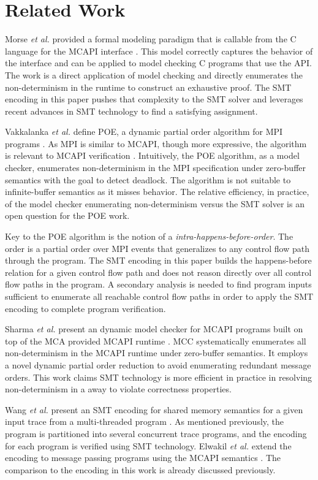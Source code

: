 \section{Related Work}
Morse \emph{et al.} provided a formal modeling paradigm that is callable from
the C language for the MCAPI interface \cite{morse:vmcai12}. This
model correctly captures the behavior of the interface and can be
applied to model checking C programs that use the API. The work is a
direct application of model checking and directly enumerates the
non-determinism in the runtime to construct an exhaustive proof. The
SMT encoding in this paper pushes that complexity to the SMT solver
and leverages recent advances in SMT technology to find a satisfying
assignment.

Vakkalanka \emph{et al.} define POE, a dynamic partial order algorithm for
MPI programs \cite{sarvani:fm09, flanagan:popl05}. As MPI is similar
to MCAPI, though more expressive, the algorithm is relevant to MCAPI
verification \cite{mpi}. Intuitively, the POE algorithm, as a model
checker, enumerates non-determinism in the MPI specification under
zero-buffer semantics with the goal to detect deadlock. The algorithm
is not suitable to infinite-buffer semantics as it misses
behavior. The relative efficiency, in practice, of the model checker
enumerating non-determinism versus the SMT solver is an open question
for the POE work.

Key to the POE algorithm is the notion of a
\textit{intra-happens-before-order}. The order is a partial order over
MPI events that generalizes to any control flow path through the
program.  The SMT encoding in this paper builds the happens-before relation
for a given control flow path and does not reason directly over all
control flow paths in the program. A secondary analysis is needed to
find program inputs sufficient to enumerate all reachable control flow
paths in order to apply the SMT encoding to complete program
verification.

Sharma \emph{et al.} present an dynamic model checker for MCAPI programs built
on top of the MCA provided MCAPI runtime \cite{sharma:fmcad09}. MCC
systematically enumerates all non-determinism in the MCAPI runtime
under zero-buffer semantics. It employs a novel dynamic partial order
reduction to avoid enumerating redundant message orders. This work
claims SMT technology is more efficient in practice in resolving
non-determinism in a away to violate correctness properties.

Wang \emph{et al.} present an SMT encoding for shared memory semantics for a
given input trace from a multi-threaded program \cite{wang:fse09}. As
mentioned previously, the program is partitioned into several
concurrent trace programs, and the encoding for each program is
verified using SMT technology. Elwakil \emph{et al.} extend the encoding to
message passing programs using the MCAPI semantics
\cite{elwakil:atva10,elwakil:padtad10}. The comparison to the encoding
in this work is already discussed previously.

